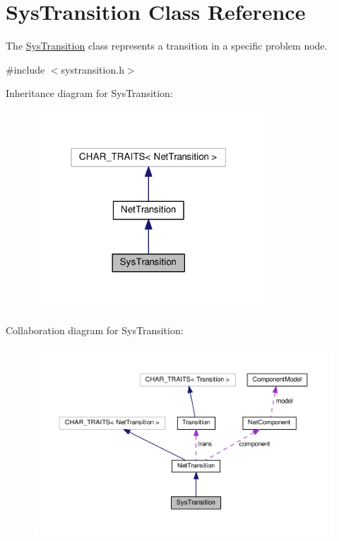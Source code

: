\hypertarget{class_sys_transition}{}\section{Sys\+Transition Class Reference}
\label{class_sys_transition}


The \hyperlink{class_sys_transition}{Sys\+Transition} class represents a transition in a specific problem node.  




{\ttfamily \#include $<$systransition.\+h$>$}



Inheritance diagram for Sys\+Transition\+:\nopagebreak
\begin{figure}[H]
\begin{center}
\leavevmode
\includegraphics[width=244pt]{class_sys_transition__inherit__graph}
\end{center}
\end{figure}


Collaboration diagram for Sys\+Transition\+:
\nopagebreak
\begin{figure}[H]
\begin{center}
\leavevmode
\includegraphics[width=350pt]{class_sys_transition__coll__graph}
\end{center}
\end{figure}

